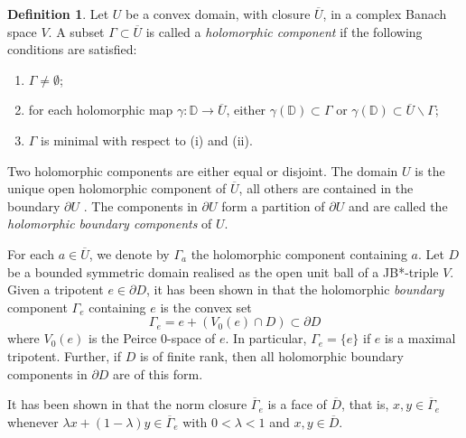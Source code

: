 \documentclass[12pt, twoside]{article}
\theoremstyle{definition}
\newtheorem{definition}[theorem]{Definition}
\numberwithin{equation}{section}
\begin{document}
\begin{definition}\label{holbdc} Let $U$ be a convex domain, with closure $\overline U$,
 in a complex Banach space $V$.
A subset $\Gamma\subset \overline U$ is called a
 {\it holomorphic
component}
if the following conditions
are satisfied:
\begin{enumerate}
\item[(i)] $\Gamma \neq \emptyset$; \item[(ii)] for each holomorphic map $ \gamma: \mathbb{D}\longrightarrow \overline U$,
either $\gamma(\mathbb{D})\subset \Gamma$ or $\gamma(\mathbb{D})
\subset \overline U \backslash \Gamma$; \item[(iii)] $\Gamma$ is minimal
with respect to (i) and (ii).
\end{enumerate}
\end{definition}
Two holomorphic components  are either equal or
disjoint. The domain $U$ is the unique open holomorphic component of $\overline U$, all others
are contained in the boundary $\partial U$ \cite{ks}. The components in $\partial U$ form a
partition of $\partial U$ and are called the {\it holomorphic boundary components} of $U$.

For each $a \in \overline U$, we denote by $\Gamma_a$ the holomorphic
component containing $a$.
Let $D$ be a bounded symmetric domain realised as the open unit ball
of a JB*-triple $V$.
Given a tripotent $e\in \partial D$, it has been shown in \cite{ks} that the holomorphic {\it boundary} component
$\Gamma_e$ containing $e$
is the convex set
\begin{equation}\label{e0} \Gamma_e= e+ (V_0(e) \cap D)\subset \partial D
\end{equation}
 where $V_0(e)$ is the Peirce $0$-space
of $e$. In particular, $\Gamma_e = \{e\}$ if $e$ is a maximal tripotent.
Further, if $D$ is of finite rank, then all holomorphic boundary components
in $\partial D$ are of this form.

It has been shown in \cite[Remark 3.4.14]{book2}
 that the norm closure  $\overline\Gamma_e$
  is a face of $\overline D$, that is, $ x, y
\in \overline \Gamma_e$ whenever $\lambda  x+ (1-\lambda)  y \in \overline\Gamma_e$ with
$0<\lambda<1$ and $x,  y\in \overline D$.
\end{document}

